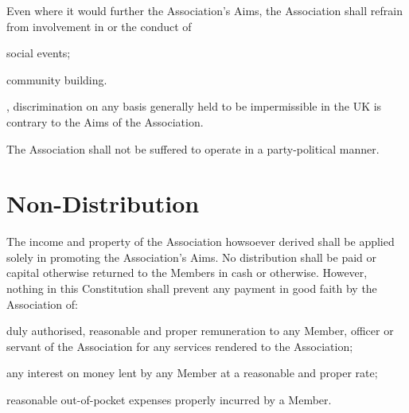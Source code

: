 \documentclass[10pt]{mk-articles-of-association}
\begin{document}
\begin{constenum}
\item Even where it would further the Association's Aims, the Association
  shall refrain from involvement in or the conduct of
  \begin{constenum}
  \item social events; \ITand
  \item community building.
  \end{constenum}

\item \avoiddoubt, discrimination on any basis generally held to be
  impermissible in the UK is contrary to the Aims of the
  Association.

\item The Association shall not be suffered to operate in
  a party-political manner.

\end{constenum}



\section{Non-Distribution}

  The income and property of the Association howsoever derived shall be
  applied solely in promoting the Association’s Aims. No distribution shall
  be paid or capital otherwise returned to the Members in cash or otherwise.
  However, nothing in this Constitution shall prevent any payment in good
  faith by the Association of:
  \begin{constenum}
  \item duly authorised, reasonable and proper remuneration to any Member,
    officer or servant of the Association for any services rendered to the
    Association;
  \item any interest on money lent by any Member at a reasonable and proper
    rate; \ITor
  \item reasonable out-of-pocket expenses properly incurred by a Member.
  \end{constenum}



\end{document}
